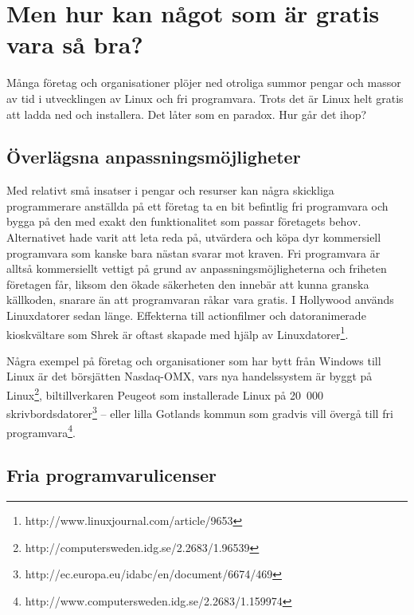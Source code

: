 \documentclass[a4paper,final]{memoir} %
\begin{document}


\section{Men hur kan något som är gratis vara så bra?}

Många företag och organisationer plöjer ned otroliga summor pengar och massor av tid i utvecklingen av Linux och fri programvara. Trots det är Linux helt gratis att ladda ned och installera. Det låter som en paradox. Hur går det ihop? 


\subsection{Överlägsna anpassningsmöjligheter}


Med relativt små insatser i pengar och resurser kan några skickliga programmerare anställda på ett företag ta en bit befintlig fri programvara och bygga på den med exakt den funktionalitet som passar företagets behov. Alternativet hade varit att leta reda på, utvärdera och köpa dyr kommersiell programvara som kanske bara nästan svarar mot kraven. Fri programvara är alltså kommersiellt vettigt på grund av anpassningsmöjligheterna och friheten företagen får, liksom den ökade säkerheten den innebär att kunna granska källkoden, snarare än att programvaran råkar vara gratis. I Hollywood används Linuxdatorer sedan länge. Effekterna till actionfilmer och datoranimerade kioskvältare som Shrek är oftast skapade med hjälp av Linuxdatorer\footnote{http://www.linuxjournal.com/article/9653}.

Några exempel på företag och organisationer som har bytt från Windows till Linux är det börsjätten Nasdaq-OMX, vars nya handelssystem är byggt på Linux\footnote{http://computersweden.idg.se/2.2683/1.96539}, biltillverkaren Peugeot som installerade Linux på 20~000 skrivbordsdatorer\footnote{http://ec.europa.eu/idabc/en/document/6674/469} -- eller lilla Gotlands kommun som gradvis vill övergå till fri programvara\footnote{http://www.computersweden.idg.se/2.2683/1.159974}.


\subsection{Fria programvarulicenser}
\end{document}

